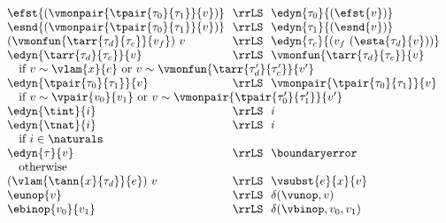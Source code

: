 \begin{flushleft}
\begin{minipage}[t]{\columnwidth}
\\
$\begin{array}{l@{~~}c@{~~}l}
  \efst{(\vmonpair{\tpair{\tau_0}{\tau_1}}{v})} & \rrLS & \edyn{\tau_0}{(\efst{v})}
\\
  \esnd{(\vmonpair{\tpair{\tau_0}{\tau_1}}{v})} & \rrLS & \edyn{\tau_1}{(\esnd{v})}
\\
  (\vmonfun{\tarr{\tau_d}{\tau_c}}{v_f})~v & \rrLS & \edyn{\tau_c}{(v_f~(\esta{\tau_d}{v}))}
\\
  \edyn{\tarr{\tau_d}{\tau_c}}{v} & \rrLS & \vmonfun{\tarr{\tau_d}{\tau_c}}{v}
\\ \multicolumn{3}{l}{\mbox{\quad if $v \sim \vlam{x}{e}$ or $v \sim \vmonfun{\tarr{\tau_d'}{\tau_c'}}{v'}$}}
\\
  \edyn{\tpair{\tau_0}{\tau_1}}{v} & \rrLS & \vmonpair{\tpair{\tau_0}{\tau_1}}{v}
\\ \multicolumn{3}{l}{\mbox{\quad if $v \sim \vpair{v_0}{v_1}$ or $v \sim \vmonpair{\tpair{\tau_0'}{\tau_1'}}{v'}$}}
\\
  \edyn{\tint}{i} & \rrLS & i
\\
  \edyn{\tnat}{i} & \rrLS & i
\\ \multicolumn{3}{l}{\mbox{\quad if $i \in \naturals$}}
\\
  \edyn{\tau}{v} & \rrLS & \boundaryerror
\\ \multicolumn{3}{l}{\mbox{\quad otherwise}}
\\
  (\vlam{\tann{x}{\tau_d}}{e})~v & \rrLS & \vsubst{e}{x}{v}
\\
  \eunop{v} & \rrLS & \delta(\vunop, v)
\\
  \ebinop{v_0}{v_1} & \rrLS & \delta(\vbinop, v_0, v_1)
\end{array}$
\end{minipage}

\end{flushleft}
